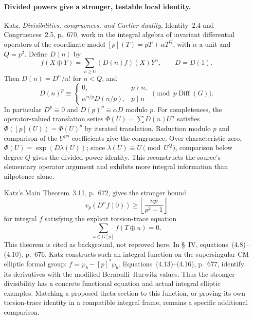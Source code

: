 \documentclass[11pt]{article}
\theoremstyle{definition}\newtheorem{definition}[theorem]{Definition}\newtheorem{remark}[theorem]{Remark}
\begin{document}
\paragraph{Divided powers give a stronger, testable local identity.}
Katz, \emph{Divisibilities, congruences, and Cartier duality},
Identity~2.4 and Congruences~2.5, p.~670, work in the integral
algebra of invariant differential operators of the coordinate model
$[p](T)=pT+\alpha T^{Q}$, with $\alpha$ a unit and $Q=p^2$.
Define $D(n)$ by
\[
 f(X\mathbin\oplus Y)=\sum_{n\geq0}(D(n)f)(X)Y^n,
 \qquad D=D(1).
\]
Then $D(n)=D^n/n!$ for $n<Q$, and
\[
 D(n)^p\equiv
 \begin{cases}
 0,&p\nmid n,\\
 \alpha^{n/p}D(n/p),&p\mid n
 \end{cases}
 \pmod{p\operatorname{Diff}(G)}.
\]
In particular $D^p\equiv0$ and $D(p)^p\equiv\alpha D$ modulo $p$.
For completeness, the operator-valued translation series
$\Phi(U)=\sum D(n)U^n$ satisfies
$\Phi([p](U))=\Phi(U)^p$ by iterated translation.
Reduction modulo $p$ and comparison of the $U^{pn}$ coefficients
give the congruence. Over characteristic zero,
$\Phi(U)=\exp(D\lambda(U))$; since
$\lambda(U)\equiv U\pmod{U^Q}$, comparison below degree $Q$
gives the divided-power identity. This reconstructs the source's
elementary operator argument and exhibits more integral information
than nilpotence alone.

Katz's Main Theorem~3.11, p.~672, gives the stronger bound
\[
 v_p(D^nf(0))\geq\left\lfloor\frac{np}{p^2-1}\right\rfloor
\]
for integral $f$ satisfying the explicit torsion-trace equation
\[
 \sum_{u\in G[p]}f(T\mathbin\oplus u)=0.
\]
This theorem is cited as background, not reproved here.
In \S~IV, equations~(4.8)--(4.10), p.~676, Katz constructs such an
integral function on the supersingular CM elliptic formal group:
$f=\wp_b-[p]^*\wp_b$. Equations~(4.13)--(4.16), p.~677, identify
its derivatives with the modified Bernoulli--Hurwitz values.
Thus the stronger divisibility has a concrete functional equation
and actual integral elliptic examples. Matching a proposed theta
section to this function, or proving its own torsion-trace identity
in a compatible integral frame, remains a specific additional
comparison.
\end{document}
